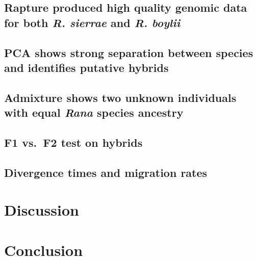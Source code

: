 \documentclass[twoside,12pt,final]{ucthesis-CA2012} %
\begin{document}
\begin{ucmainmatter}
\hypertarget{rapture-produced-high-quality-genomic-data-for-both-r.-sierrae-and-r.-boylii}{%
\subsection{\texorpdfstring{Rapture produced high quality genomic data
for both \emph{R. sierrae} and \emph{R.
boylii}}{Rapture produced high quality genomic data for both R. sierrae and R. boylii}}\label{rapture-produced-high-quality-genomic-data-for-both-r.-sierrae-and-r.-boylii}}

\hypertarget{pca-shows-strong-separation-between-species-and-identifies-putative-hybrids}{%
\subsection{PCA shows strong separation between species and identifies
putative
hybrids}\label{pca-shows-strong-separation-between-species-and-identifies-putative-hybrids}}

\hypertarget{admixture-shows-two-unknown-individuals-with-equal-rana-species-ancestry}{%
\subsection{\texorpdfstring{Admixture shows two unknown individuals with
equal \emph{Rana} species
ancestry}{Admixture shows two unknown individuals with equal Rana species ancestry}}\label{admixture-shows-two-unknown-individuals-with-equal-rana-species-ancestry}}

\hypertarget{f1-vs.f2-test-on-hybrids}{%
\subsection{F1 vs.~F2 test on hybrids}\label{f1-vs.f2-test-on-hybrids}}

\hypertarget{divergence-times-and-migration-rates}{%
\subsection{Divergence times and migration
rates}\label{divergence-times-and-migration-rates}}

\hypertarget{discussion-1}{%
\section{Discussion}\label{discussion-1}}

\hypertarget{conclusion-1}{%
\section{Conclusion}\label{conclusion-1}}


\end{ucmainmatter}
\end{document}
